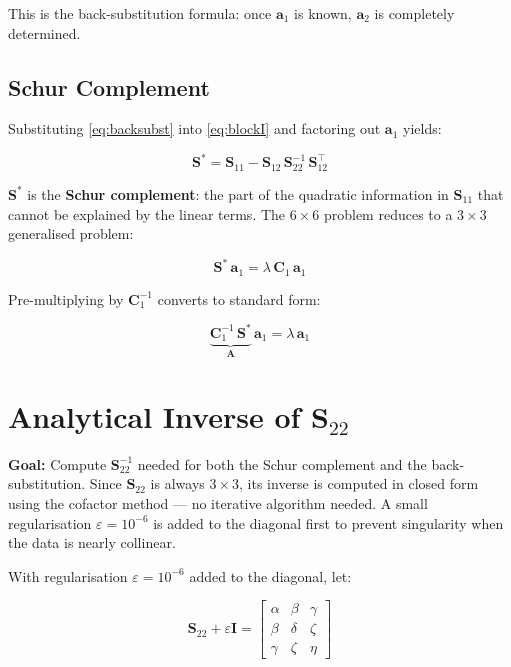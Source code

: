\documentclass{article}
\begin{document}
	This is the back-substitution formula: once $\mathbf{a}_1$
	is known, $\mathbf{a}_2$ is completely determined.
	
	\subsection{Schur Complement}
	
	Substituting \eqref{eq:backsubst} into \eqref{eq:blockI}
	and factoring out $\mathbf{a}_1$ yields:
	
	\begin{equation}
		\boxed{\mathbf{S}^* = \mathbf{S}_{11}
			- \mathbf{S}_{12}\,\mathbf{S}_{22}^{-1}\,\mathbf{S}_{12}^\top}
		\label{eq:schur}
	\end{equation}
	
	$\mathbf{S}^*$ is the \textbf{Schur complement}: the part of
	the quadratic information in $\mathbf{S}_{11}$ that cannot be
	explained by the linear terms.
	The $6\times6$ problem reduces to a $3\times3$ generalised problem:
	
	\begin{equation}
		\mathbf{S}^*\,\mathbf{a}_1 = \lambda\,\mathbf{C}_1\,\mathbf{a}_1
	\end{equation}
	
	Pre-multiplying by $\mathbf{C}_1^{-1}$ converts to standard form:
	
	\begin{equation}
		\underbrace{\mathbf{C}_1^{-1}\,\mathbf{S}^*}_{\mathbf{A}}\,\mathbf{a}_1
		= \lambda\,\mathbf{a}_1
		\label{eq:standard_eig}
	\end{equation}
	

	\section{Analytical Inverse of $\mathbf{S}_{22}$}

	
	\textbf{Goal:} Compute $\mathbf{S}_{22}^{-1}$ needed for both
	the Schur complement and the back-substitution.
    Since $\mathbf{S}_{22}$ is always $3\times3$,
	its inverse is computed in closed form using the cofactor method ---
	no iterative algorithm needed.
	A small regularisation $\varepsilon = 10^{-6}$ is added to the
	diagonal first to prevent singularity when the data is
	nearly collinear.
	
	With regularisation $\varepsilon = 10^{-6}$ added to the diagonal, let:
	
	\begin{equation}
		\mathbf{S}_{22} + \varepsilon\mathbf{I} =
		\begin{bmatrix}
			\alpha & \beta  & \gamma \\
			\beta  & \delta & \zeta  \\
			\gamma & \zeta  & \eta
		\end{bmatrix}
	\end{equation}
	
\end{document}
